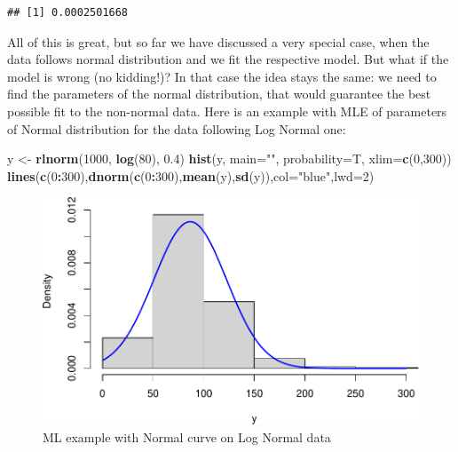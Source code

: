 \documentclass[
]{book}
\newenvironment{Shaded}{\begin{snugshade}}{\end{snugshade}}
\newcommand{\AttributeTok}[1]{\textcolor[rgb]{0.13,0.29,0.53}{#1}}
\newcommand{\DecValTok}[1]{\textcolor[rgb]{0.00,0.00,0.81}{#1}}
\newcommand{\FloatTok}[1]{\textcolor[rgb]{0.00,0.00,0.81}{#1}}
\newcommand{\FunctionTok}[1]{\textcolor[rgb]{0.13,0.29,0.53}{\textbf{#1}}}
\newcommand{\NormalTok}[1]{#1}
\newcommand{\OtherTok}[1]{\textcolor[rgb]{0.56,0.35,0.01}{#1}}
\newcommand{\SpecialCharTok}[1]{\textcolor[rgb]{0.81,0.36,0.00}{\textbf{#1}}}
\newcommand{\StringTok}[1]{\textcolor[rgb]{0.31,0.60,0.02}{#1}}
\theoremstyle{definition}
\theoremstyle{definition}
\theoremstyle{definition}
\theoremstyle{definition}
\theoremstyle{remark}
\begin{document}
\begin{verbatim}
## [1] 0.0002501668
\end{verbatim}

All of this is great, but so far we have discussed a very special case, when the data follows normal distribution and we fit the respective model. But what if the model is wrong (no kidding!)? In that case the idea stays the same: we need to find the parameters of the normal distribution, that would guarantee the best possible fit to the non-normal data. Here is an example with MLE of parameters of Normal distribution for the data following Log Normal one:

\begin{Shaded}
\begin{Highlighting}[]
\NormalTok{y }\OtherTok{\textless{}{-}} \FunctionTok{rlnorm}\NormalTok{(}\DecValTok{1000}\NormalTok{, }\FunctionTok{log}\NormalTok{(}\DecValTok{80}\NormalTok{), }\FloatTok{0.4}\NormalTok{)}
\FunctionTok{hist}\NormalTok{(y, }\AttributeTok{main=}\StringTok{""}\NormalTok{, }\AttributeTok{probability=}\NormalTok{T, }\AttributeTok{xlim=}\FunctionTok{c}\NormalTok{(}\DecValTok{0}\NormalTok{,}\DecValTok{300}\NormalTok{))}
\FunctionTok{lines}\NormalTok{(}\FunctionTok{c}\NormalTok{(}\DecValTok{0}\SpecialCharTok{:}\DecValTok{300}\NormalTok{),}\FunctionTok{dnorm}\NormalTok{(}\FunctionTok{c}\NormalTok{(}\DecValTok{0}\SpecialCharTok{:}\DecValTok{300}\NormalTok{),}\FunctionTok{mean}\NormalTok{(y),}\FunctionTok{sd}\NormalTok{(y)),}\AttributeTok{col=}\StringTok{"blue"}\NormalTok{,}\AttributeTok{lwd=}\DecValTok{2}\NormalTok{)}
\end{Highlighting}
\end{Shaded}

\begin{figure}
\centering
\includegraphics{Svetunkov---Statistics-for-Business-Analytics_files/figure-latex/MLENormalExample07-1.pdf}
\caption{\label{fig:MLENormalExample07}ML example with Normal curve on Log Normal data}
\end{figure}
\end{document}
